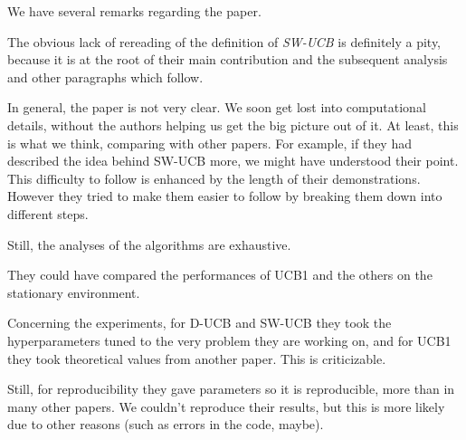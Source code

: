 We have several remarks regarding the paper.

The obvious lack of rereading of the definition of \textit{SW-UCB} is definitely a pity, because it is at the root of their main contribution and the subsequent analysis and other paragraphs which follow.

In general, the paper is not very clear. We soon get lost into computational details, without the authors helping us get the big picture out of it. At least, this is what we think, comparing with other papers. For example, if they had described the idea behind SW-UCB more, we might have understood their point.  This difficulty to follow is enhanced by the length of their demonstrations. However they tried to make them easier to follow by breaking them down into different steps.

Still, the analyses of the algorithms are exhaustive.

They could have compared the performances of UCB1 and the others on the stationary environment.

Concerning the experiments, for D-UCB and SW-UCB they took the hyperparameters tuned to the very problem they are working on, and for UCB1 they took theoretical values from another paper. This is criticizable. 

Still, for reproducibility they gave parameters so it is reproducible, more than in many other papers. We couldn't reproduce their results, but this is more likely due to other reasons (such as errors in the code, maybe).